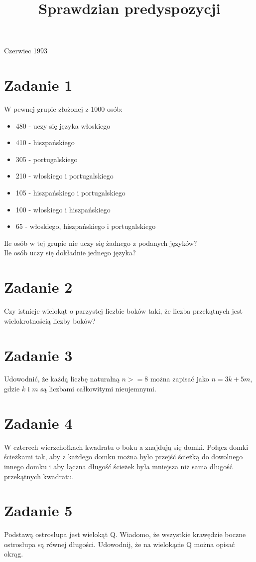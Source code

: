 \documentclass[10pt]{article}
\title{Sprawdzian predyspozycji }
\author{}
\date{}
\begin{document}
\maketitle
Czerwiec 1993

\section*{Zadanie 1}
W pewnej grupie złożonej z 1000 osób:

\begin{itemize}
  \item 480 - uczy się języka włoskiego
  \item 410 - hiszpańskiego
  \item 305 - portugalskiego
  \item 210 - włoskiego i portugalskiego
  \item 105 - hiszpańskiego i portugalskiego
  \item 100 - włoskiego i hiszpańskiego
  \item 65 - włoskiego, hiszpańskiego i portugalskiego
\end{itemize}

Ile osób w tej grupie nie uczy się żadnego z podanych języków?\\
Ile osób uczy się dokładnie jednego języka?

\section*{Zadanie 2}
Czy istnieje wielokąt o parzystej liczbie boków taki, że liczba przekątnych jest wielokrotnością liczby boków?

\section*{Zadanie 3}
Udowodnić, że każdą liczbę naturalną \(n>=8\) można zapisać jako \(n=3 k+5 m\), gdzie \(k\) i \(m\) są liczbami całkowitymi nieujemnymi.

\section*{Zadanie 4}
W czterech wierzchołkach kwadratu o boku a znajdują się domki. Połącz domki ścieżkami tak, aby z każdego domku można było przejść ścieżką do dowolnego innego domku i aby łączna długość ścieżek była mniejsza niż sama długość przekątnych kwadratu.

\section*{Zadanie 5}
Podstawą ostrosłupa jest wielokąt Q. Wiadomo, że wszystkie krawędzie boczne ostrosłupa są równej długości. Udowodnij, że na wielokącie Q można opisać okrąg.
\end{document}

